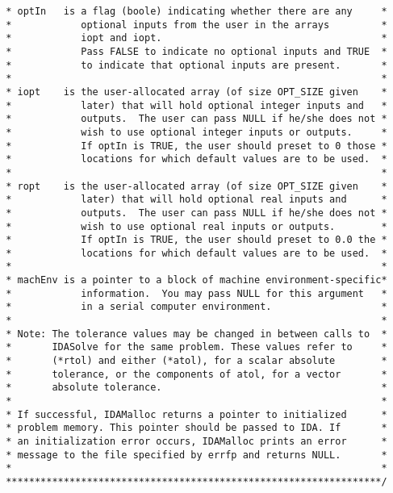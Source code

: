 \documentclass[11pt]{article}
\begin{document}
\begin{verbatim}
 * optIn   is a flag (boole) indicating whether there are any     *
 *            optional inputs from the user in the arrays         *
 *            iopt and iopt.                                      *
 *            Pass FALSE to indicate no optional inputs and TRUE  *
 *            to indicate that optional inputs are present.       *
 *                                                                *
 * iopt    is the user-allocated array (of size OPT_SIZE given    *
 *            later) that will hold optional integer inputs and   *
 *            outputs.  The user can pass NULL if he/she does not *
 *            wish to use optional integer inputs or outputs.     *
 *            If optIn is TRUE, the user should preset to 0 those *
 *            locations for which default values are to be used.  *
 *                                                                *
 * ropt    is the user-allocated array (of size OPT_SIZE given    *
 *            later) that will hold optional real inputs and      *
 *            outputs.  The user can pass NULL if he/she does not *
 *            wish to use optional real inputs or outputs.        *
 *            If optIn is TRUE, the user should preset to 0.0 the *
 *            locations for which default values are to be used.  *
 *                                                                *
 * machEnv is a pointer to a block of machine environment-specific*
 *            information.  You may pass NULL for this argument   *
 *            in a serial computer environment.                   *
 *                                                                *
 * Note: The tolerance values may be changed in between calls to  *
 *       IDASolve for the same problem. These values refer to     *
 *       (*rtol) and either (*atol), for a scalar absolute        *
 *       tolerance, or the components of atol, for a vector       *
 *       absolute tolerance.                                      *
 *                                                                * 
 * If successful, IDAMalloc returns a pointer to initialized      *
 * problem memory. This pointer should be passed to IDA. If       *
 * an initialization error occurs, IDAMalloc prints an error      *
 * message to the file specified by errfp and returns NULL.       *
 *                                                                *
 *****************************************************************/
 
\end{verbatim}
\normalsize
\end{document}
